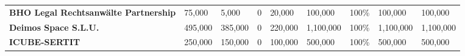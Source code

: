 \begin{table}[H]
{\begin{tabular}{p{5cm}p{2cm}p{2cm}p{2.5cm}p{2cm}p{2cm}p{2cm}p{2cm}p{2cm}}
\textbf{BHO Legal Rechtsanwälte Partnership} & 75,000                                                                                                & 5,000                                                                                           &0                                                                                                                & 20,000                                                                                     & 100,000                                                                                                    & 100\%                                                                                                & 100,000                                                                                             & 100,000                                                                                               \\
\textbf{Deimos Space S.L.U.}                 & 495,000                                                                                               & 385,000                                                                                         &0                                                                                                                & 220,000                                                                                    & 1,100,000                                                                                                  & 100\%                                                                                                & 1,100,000                                                                                           & 1,100,000                                                                                             \\
\textbf{ICUBE-SERTIT}                                                                    & 250,000                                                                                               & 150,000                                                                                         &0                                                                                                                & 100,000                                                                                    & 500,000                                                                                                    & 100\%                                                                                                & 500,000                                                                                             & 500,000                                                                                               \\

\end{tabular}}
\end{table}

